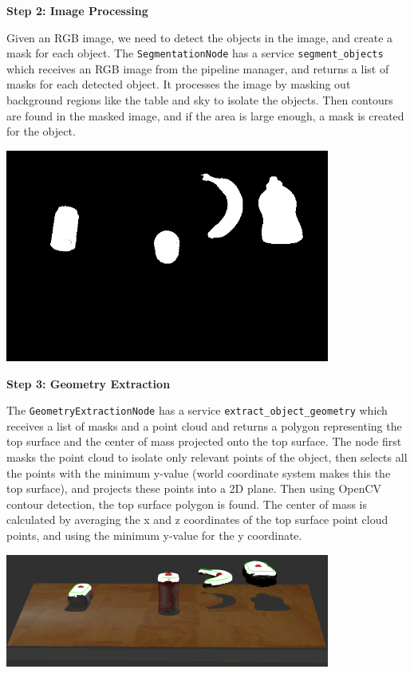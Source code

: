 \documentclass[12pt]{article}
\begin{document}
\textbf{Step 2: Image Processing}

Given an RGB image, we need to detect the objects in the image, and create a mask for each object. The \texttt{SegmentationNode} has a service \texttt{segment\_objects} which receives an RGB image from the pipeline manager, and returns a list of masks for each detected object. It processes the image by masking out background regions like the table and sky to isolate the objects. Then contours are found in the masked image, and if the area is large enough, a mask is created for the object. 

\begin{center}
	\includegraphics[width=0.8\textwidth]{masks.png}
\end{center}

\textbf{Step 3: Geometry Extraction}

The \texttt{GeometryExtractionNode} has a service \texttt{extract\_object\_geometry} which receives a list of masks and a point cloud and returns a polygon representing the top surface and the center of mass projected onto the top surface. The node first masks the point cloud to isolate only relevant points of the object, then selects all the points with the minimum y-value (world coordinate system makes this the top surface), and projects these points into a 2D plane. Then using OpenCV contour detection, the top surface polygon is found. The center of mass is calculated by averaging the x and z coordinates of the top surface point cloud points, and using the minimum y-value for the y coordinate.

\begin{center}
	\includegraphics[width=0.8\textwidth]{toppoints.png}
\end{center}
\end{document}
